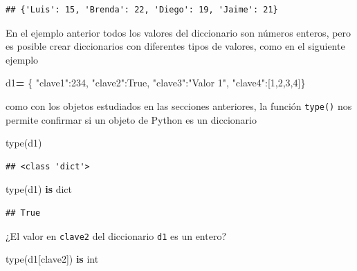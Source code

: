 \documentclass[
]{book}
\newenvironment{Shaded}{\begin{snugshade}}{\end{snugshade}}
\newcommand{\BuiltInTok}[1]{#1}
\newcommand{\DecValTok}[1]{\textcolor[rgb]{0.00,0.00,0.81}{#1}}
\newcommand{\KeywordTok}[1]{\textcolor[rgb]{0.13,0.29,0.53}{\textbf{#1}}}
\newcommand{\NormalTok}[1]{#1}
\newcommand{\OperatorTok}[1]{\textcolor[rgb]{0.81,0.36,0.00}{\textbf{#1}}}
\newcommand{\StringTok}[1]{\textcolor[rgb]{0.31,0.60,0.02}{#1}}
\newcommand{\VariableTok}[1]{\textcolor[rgb]{0.00,0.00,0.00}{#1}}
\theoremstyle{definition}
\theoremstyle{definition}
\theoremstyle{definition}
\theoremstyle{definition}
\theoremstyle{remark}
\begin{document}
\begin{verbatim}
## {'Luis': 15, 'Brenda': 22, 'Diego': 19, 'Jaime': 21}
\end{verbatim}

En el ejemplo anterior todos los valores del diccionario son números enteros, pero es posible crear diccionarios con diferentes tipos de valores, como en el siguiente ejemplo

\begin{Shaded}
\begin{Highlighting}[]
\NormalTok{d1}\OperatorTok{=}\NormalTok{ \{}
     \StringTok{"clave1"}\NormalTok{:}\DecValTok{234}\NormalTok{,}
     \StringTok{"clave2"}\NormalTok{:}\VariableTok{True}\NormalTok{,}
     \StringTok{"clave3"}\NormalTok{:}\StringTok{"Valor 1"}\NormalTok{,}
     \StringTok{"clave4"}\NormalTok{:[}\DecValTok{1}\NormalTok{,}\DecValTok{2}\NormalTok{,}\DecValTok{3}\NormalTok{,}\DecValTok{4}\NormalTok{]\}}
\end{Highlighting}
\end{Shaded}

como con los objetos estudiados en las secciones anteriores, la función \texttt{type()} nos permite confirmar si un objeto de Python es un diccionario

\begin{Shaded}
\begin{Highlighting}[]
\BuiltInTok{type}\NormalTok{(d1)}
\end{Highlighting}
\end{Shaded}

\begin{verbatim}
## <class 'dict'>
\end{verbatim}

\begin{Shaded}
\begin{Highlighting}[]
\BuiltInTok{type}\NormalTok{(d1) }\KeywordTok{is} \BuiltInTok{dict} 
\end{Highlighting}
\end{Shaded}

\begin{verbatim}
## True
\end{verbatim}

¿El valor en \texttt{clave2} del diccionario \texttt{d1} es un entero?

\begin{Shaded}
\begin{Highlighting}[]
\BuiltInTok{type}\NormalTok{(d1[}\StringTok{\textquotesingle{}clave2\textquotesingle{}}\NormalTok{]) }\KeywordTok{is} \BuiltInTok{int}  
\end{Highlighting}
\end{Shaded}
\end{document}
